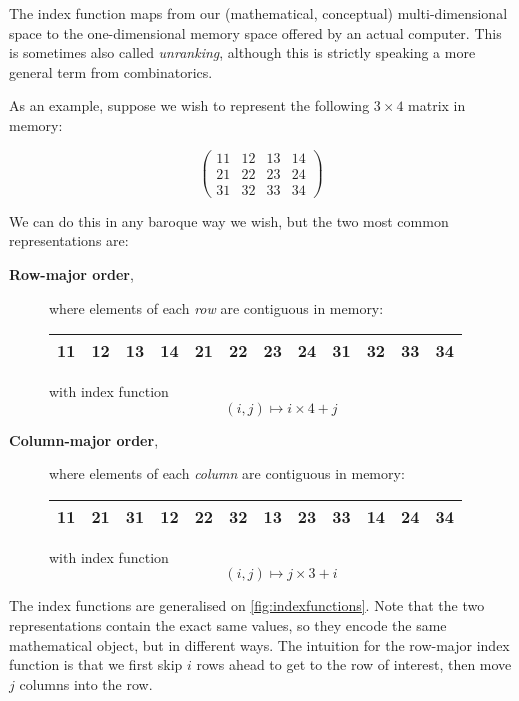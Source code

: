 The index function maps from our (mathematical, conceptual)
multi-dimensional space to the one-dimensional memory space offered by
an actual computer.  This is sometimes also called \textit{unranking},
although this is strictly speaking a more general term from
combinatorics.

As an example, suppose we wish to represent the following $3\times{}4$ matrix in memory:

\begin{equation}
  \begin{pmatrix}
    11 & 12 & 13 & 14 \\
    21 & 22 & 23 & 24 \\
    31 & 32 & 33 & 34
  \end{pmatrix}
\label{eqn:matA}
\end{equation}

We can do this in any baroque way we wish, but the two most common
representations are:

\begin{description}
\item[\textbf{Row-major order},] where elements of each \textit{row} are
  contiguous in memory:

  \begin{center}
  \begin{tabular}{|c|c|c|c|c|c|c|c|c|c|c|c|}
    \hline
    11&12&13&14&21&22&23&24&31&32&33&34\\
    \hline
  \end{tabular}
  \end{center}

  with index function
  \[
    (i,j) \mapsto i\times 4 + j
  \]
\item[\textbf{Column-major order},] where elements of each \textit{column}
  are contiguous in memory:

  \begin{center}
  \begin{tabular}{|c|c|c|c|c|c|c|c|c|c|c|c|}
    \hline
    11&21&31&12&22&32&13&23&33&14&24&34\\
    \hline
  \end{tabular}
  \end{center}

  with index function
  \[
    (i,j) \mapsto j\times 3 + i
  \]
\end{description}

The index functions are generalised on \cref{fig:indexfunctions}.
Note that the two representations contain the exact same values, so
they encode the same mathematical object, but in different ways.  The
intuition for the row-major index function is that we first skip $i$
rows ahead to get to the row of interest, then move $j$ columns into
the row.

